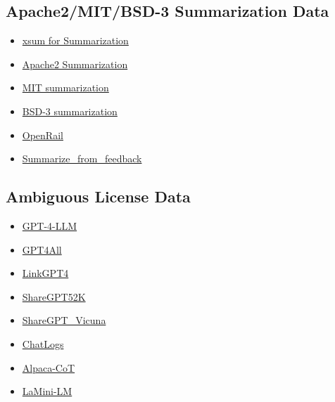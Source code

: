 \documentclass{article}
\begin{document}
\subsection*{Apache2/MIT/BSD-3 Summarization Data}
\begin{itemize}
    \item \href{https://huggingface.co/datasets/xsum}{xsum for Summarization}
    \item \href{https://huggingface.co/datasets?task_categories=task_categories:summarization&license=license:apache-2.0&sort=downloads}{Apache2 Summarization}
    \item \href{https://huggingface.co/datasets?task_categories=task_categories:summarization&license=license:mit&sort=downloads}{MIT summarization}
    \item \href{https://huggingface.co/datasets?task_categories=task_categories:summarization&license=license:bsd-3-clause&sort=downloads}{BSD-3 summarization}
    \item \href{https://huggingface.co/datasets?task_categories=task_categories:summarization&license=license:openrail&sort=downloads}{OpenRail}
    \item \href{https://huggingface.co/datasets/openai/summarize_from_feedback}{Summarize\_from\_feedback}
\end{itemize}

\subsection*{Ambiguous License Data}
\begin{itemize}
    \item \href{https://github.com/Instruction-Tuning-with-GPT-4/GPT-4-LLM}{GPT-4-LLM}
    \item \href{https://huggingface.co/datasets/nomic-ai/gpt4all_prompt_generations}{GPT4All}
    \item \href{https://github.com/lm-sys/FastChat/issues/90#issuecomment-1493250773}{LinkGPT4}
    \item \href{https://huggingface.co/datasets/RyokoAI/ShareGPT52K}{ShareGPT52K}
    \item \href{https://huggingface.co/datasets/anon8231489123/ShareGPT_Vicuna_unfiltered}{ShareGPT\_Vicuna}
    \item \href{https://chatlogs.net/}{ChatLogs}
    \item \href{https://github.com/PhoebusSi/alpaca-CoT}{Alpaca-CoT}
    \item \href{https://github.com/mbzuai-nlp/LaMini-LM}{LaMini-LM}
\end{itemize}
\end{document}
